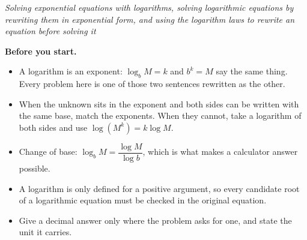 \documentclass[12pt]{article}
\begin{document}

\begin{center}
\textit{Solving exponential equations with logarithms, solving logarithmic
equations by rewriting them in exponential form, and using the logarithm laws
to rewrite an equation before solving it}
\end{center}

\noindent\textbf{Before you start.}
\begin{itemize}[leftmargin=1.2cm, itemsep=2pt, topsep=2pt]
\item A logarithm is an exponent: $\log_b M = k$ and $b^k = M$ say the same
thing. Every problem here is one of those two sentences rewritten as the other.
\item When the unknown sits in the exponent and both sides can be written with
the same base, match the exponents. When they cannot, take a logarithm of both
sides and use $\log(M^k) = k\log M$.
\item Change of base: $\log_b M = \dfrac{\log M}{\log b}$, which is what makes
a calculator answer possible.
\item A logarithm is only defined for a positive argument, so every candidate
root of a logarithmic equation must be checked in the original equation.
\item Give a decimal answer only where the problem asks for one, and state the
unit it carries.
\end{itemize}

\vspace{0.2cm}



\end{document}
